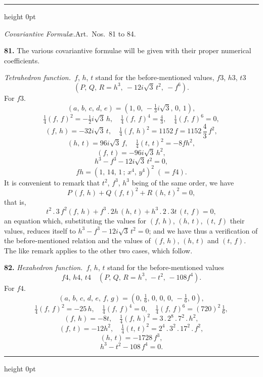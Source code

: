\documentclass[11pt,a4paper]{article}
\newcommand{\artno}[1]{\textbf{#1.}\quad}
\begin{document}
\bigskip
\hrule height 0pt
\bigskip

\begin{center}
\textit{Covariantive Formul\ae.}\quad Art.\ Nos.\ 81 to 84.
\end{center}

\artno{81} The various covariantive formulae will be given with their proper
numerical coefficients.

\smallskip
\noindent\textit{Tetrahedron function.}\ $f$, $h$, $t$ stand for the
before-mentioned values, $f3$, $h3$, $t3$
\[
  (P,\,Q,\,R = h^{3},\ -12 i\sqrt{3}\,t^{2},\ -f^{6}).
\]
For $f3$.
\[
  (a,\,b,\,c,\,d,\,e) = (1,\,0,\,-\tfrac{1}{3}i\sqrt{3},\,0,\,1),
\]
\[
  \tfrac{1}{4}(f,\,f)^{2} = -\tfrac{1}{2}i\sqrt{3}\,h,\quad
  \tfrac{1}{4}(f,\,f)^{4} = \tfrac{4}{3},\quad
  \tfrac{1}{4}(f,\,f)^{6} = 0,
\]
\[
  (f,\,h) = -32 i\sqrt{3}\,t,\quad
  \tfrac{1}{4}(f,\,h)^{2} = 1152\,f = 1152\,\dfrac{4}{3}\,f^{2},
\]
\[
  (h,\,t) = 96 i\sqrt{3}\,f,\quad
  \tfrac{1}{4}(t,\,t)^{2} = -8 f h^{2},
\]
\[
  (f,\,t) = -96 i\sqrt{3}\,h^{2},
\]
\[
  h^{3} - f^{3} - 12 i\sqrt{3}\,t^{2} = 0,
\]
\[
  fh = (1,\,14,\,1\,;\,x^{4},\,y^{4})^{2}\;(= f4).
\]
It is convenient to remark that $t^{2}$, $f^{3}$, $h^{3}$ being of the same
order, we have
\[
  P\,(f,\,h) + Q\,(f,\,t)^{2} + R\,(h,\,t)^{2} = 0,
\]
that is,
\[
  t^{2}\,.\,3\,f^{2}(f,\,h) + f^{3}\,.\,2 h\,(h,\,t)
   + h^{3}\,.\,2\,.\,3 t\,(t,\,f) = 0,
\]
an equation which, substituting the values for $(f,\,h)$, $(h,\,t)$, $(t,\,f)$
their values, reduces itself to $h^{3} - f^{3} - 12 i\sqrt{3}\,t^{2} = 0$;
and we have thus a verification of the before-mentioned relation and the
values of $(f,\,h)$, $(h,\,t)$ and $(t,\,f)$. The like remark applies to the
other two cases, which follow.

\artno{82} \textit{Hexahedron function.}\ $f$, $h$, $t$ stand for the
before-mentioned values
\[
  f4,\,h4,\,t4\quad(P,\,Q,\,R = h^{3},\,-t^{2},\,-108 f^{4}).
\]
For $f4$.
\[
  (a,\,b,\,c,\,d,\,e,\,f,\,g) = (0,\,\tfrac{1}{6},\,0,\,0,\,0,\,-\tfrac{1}{6},\,0),
\]
\[
  \tfrac{1}{4}(f,\,f)^{2} = -25\,h,\quad
  \tfrac{1}{4}(f,\,f)^{4} = 0,\quad
  \tfrac{1}{4}(f,\,f)^{6} = (720)^{2}\,\tfrac{1}{6},
\]
\[
  (f,\,h) = -8 t,\quad
  \tfrac{1}{4}(f,\,h)^{2} = 3\,.\,2^{8}\,.\,7^{2}\,.\,h^{2},
\]
\[
  (f,\,t) = -12 h^{2},\quad
  \tfrac{1}{4}(t,\,t)^{2} = 2^{4}\,.\,3^{2}\,.\,17^{2}\,.\,f^{2},
\]
\[
  (h,\,t) = -1728\,f^{3},
\]
\[
  h^{3} - t^{2} - 108\,f^{4} = 0.
\]

\bigskip
\hrule height 0pt
\bigskip
\end{document}
